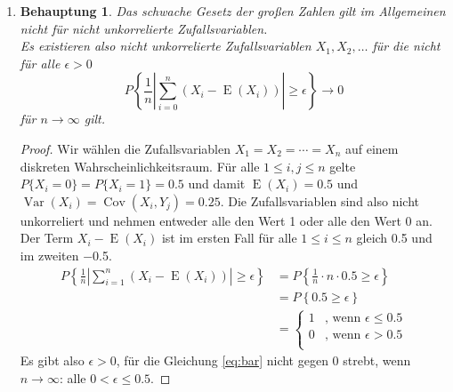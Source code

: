 \documentclass[a4paper]{scrartcl}
\newtheorem*{behaupt}{Behauptung}
\newcommand{\cov}{\operatorname{Cov}}
\newcommand{\e}{\operatorname{E}}
\newcommand{\var}{\operatorname{Var}}
\begin{document}
\begin{enumerate}[label=\bfseries\arabic*.]
    \item
        \begin{behaupt}
            Das schwache Gesetz der großen Zahlen gilt im Allgemeinen nicht für
            nicht unkorrelierte Zufallsvariablen. \\
            Es existieren also nicht unkorrelierte Zufallsvariablen
            $X_1, X_2, \dotsc$ für die nicht für alle $\epsilon > 0$
            \begin{equation}
                P\left\{
                    \frac{1}{n} \left| \sum_{i=0}^n (X_i - \e(X_i)) \right|
                    \geq \epsilon
                \right\}
                \to 0
            \end{equation}
            für $n \to \infty$ gilt.
        \end{behaupt}
        \begin{proof}
            Wir wählen die Zufallsvariablen $X_1 = X_2 = \dotsb = X_n$ auf einem
            diskreten Wahrscheinlichkeitsraum.
            Für alle $1 \leq i, j \leq n$ gelte $P\{X_i = 0\} = P\{X_i = 1\} =
            \num{0,5}$ und damit $\e(X_i) = \num{0,5}$ und $\var(X_i) =
            \cov(X_i, Y_j) = \num{0,25}$.
            Die Zufallsvariablen sind also nicht unkorreliert und nehmen
            entweder alle den Wert 1 oder alle den Wert 0 an.
            Der Term $X_i - \e(X_i)$ ist im ersten Fall für alle
            $1 \leq i \leq n$ gleich \num{0,5} und im zweiten \num{-0,5}.
            \begin{equation}
                \begin{split}
                    P\left\{
                        \frac{1}{n} \left| \sum_{i=1}^n (X_i - \e(X_i)) \right|
                        \geq \epsilon
                    \right\}
                    &=
                    P\left\{
                        \frac{1}{n} \cdot n \cdot \num{0,5} \geq \epsilon
                    \right\} \\
                    &= P\left\{ \num{0,5} \geq \epsilon \right\} \\
                    &=
                    \begin{cases}
                        1 & \text{, wenn } \epsilon \leq \num{0,5} \\
                        0 & \text{, wenn } \epsilon > \num{0,5} \\
                    \end{cases}
                \end{split}
                \label{eq:bar}
            \end{equation}
            Es gibt also $\epsilon > 0$, für die Gleichung \eqref{eq:bar} nicht
            gegen 0 strebt, wenn $n \to \infty$:
            alle $0 < \epsilon \leq \num{0,5}$.
        \end{proof}

\end{enumerate}
\end{document}

